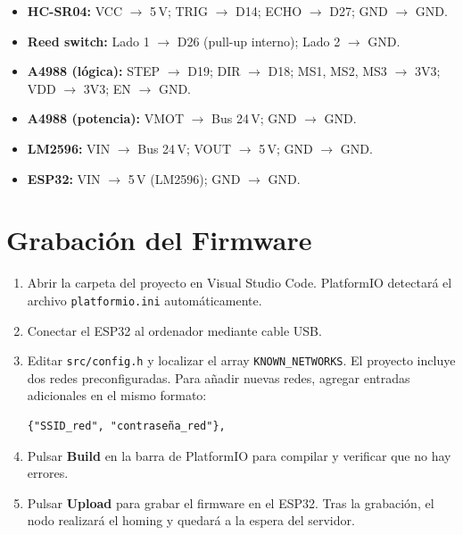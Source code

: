 \begin{itemize}[topsep=4pt, partopsep=0pt, itemsep=2pt, parsep=0pt]
    \item \textbf{HC-SR04:} VCC $\rightarrow$ 5\,V;\; TRIG $\rightarrow$ D14;\; ECHO $\rightarrow$ D27;\; GND $\rightarrow$ GND.
    \item \textbf{Reed switch:} Lado 1 $\rightarrow$ D26 (pull-up interno);\; Lado 2 $\rightarrow$ GND.
    \item \textbf{A4988 (lógica):} STEP $\rightarrow$ D19;\; DIR $\rightarrow$ D18;\; MS1, MS2, MS3 $\rightarrow$ 3V3;\; VDD $\rightarrow$ 3V3;\; EN $\rightarrow$ GND.
    \item \textbf{A4988 (potencia):} VMOT $\rightarrow$ Bus 24\,V;\; GND $\rightarrow$ GND.
    \item \textbf{LM2596:} VIN $\rightarrow$ Bus 24\,V;\; VOUT $\rightarrow$ 5\,V;\; GND $\rightarrow$ GND.
    \item \textbf{ESP32:} VIN $\rightarrow$ 5\,V (LM2596);\; GND $\rightarrow$ GND.
\end{itemize}

\section{Grabación del Firmware}

\begin{enumerate}
    \item Abrir la carpeta del proyecto en Visual Studio Code. PlatformIO detectará el archivo \texttt{platformio.ini} automáticamente.

    \item Conectar el ESP32 al ordenador mediante cable USB.

    \item Editar \texttt{src/config.h} y localizar el array \texttt{KNOWN\_NETWORKS}. El proyecto incluye dos redes preconfiguradas. Para añadir nuevas redes, agregar entradas adicionales en el mismo formato:

\begin{verbatim}
{"SSID_red", "contraseña_red"},
\end{verbatim}

    \item Pulsar \textbf{Build} en la barra de PlatformIO para compilar y verificar que no hay errores.

    \item Pulsar \textbf{Upload} para grabar el firmware en el ESP32. Tras la grabación, el nodo realizará el homing y quedará a la espera del servidor.
\end{enumerate}

